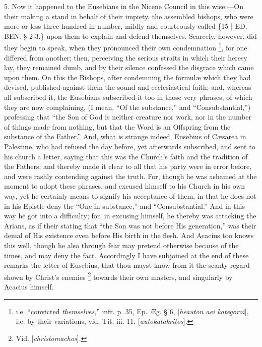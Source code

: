 5. Now it happened to the
Eusebians in the Nicene Council in this wise:—On their making a
stand in behalf of their impiety, the assembled bishops, who were more
or less three hundred in number, mildly and courteously called \{15 | ED. BEN.
§ 2-3.\} upon them to explain and defend themselves. Scarcely,
however, did they begin to speak, when they pronounced their own
condemnation \footnote{i.e. ``convicted \emph{themselves},'' infr. p. 35, Ep. Æg. § 6, [\emph{heaut\={o}n
aei kategoroi}], i.e. by their variations, vid. Tit. iii. 11, [\emph{autokatakritos}].}, for one
differed from another; then, perceiving the serious straits in which
their heresy lay, they remained dumb, and by their silence confessed
the disgrace which came upon them. On this the Bishops, after
condemning the formulæ which they had devised, published against them
the sound and ecclesiastical faith; and, whereas all subscribed it,
the Eusebians subscribed it too in those very phrases, of which they
are now complaining, (I mean, ``Of the substance,'' and ``Consubstantial,'')
professing that ``the Son of God is neither creature nor work, nor in
the number of things made from nothing, but that the Word is an
Offspring from the substance of the Father.'' And, what is strange
indeed, Eusebius of Cæsarea in Palestine, who had refused the day
before, yet afterwards subscribed, and sent to his church a letter,
saying that this was the Church's faith and the tradition of the
Fathers; and thereby made it clear to all that his party were in error
before, and were rashly contending against the truth. For, though he
was ashamed at the moment to adopt these phrases, and excused himself
to his Church in his own way, yet he certainly means to signify his
acceptance of them, in that he does not in his Epistle deny the ``One
in substance,'' and ``Consubstantial.'' And in this way he got into a
difficulty; for, in excusing himself, he thereby was attacking the
Arians, as if their stating that ``the Son was not before His
generation,'' was their denial of His existence even before His birth
in the flesh. And Acacius too knows this well, though he also through
fear may pretend otherwise because of the times, and may deny the
fact. Accordingly I have subjoined at the end of these remarks
the letter of Eusebius, that thou mayst know from it the scanty regard
shown by Christ's enemies \footnote{Vid. [\emph{christomachos}].}
towards their own masters, and singularly by Acacius himself.

